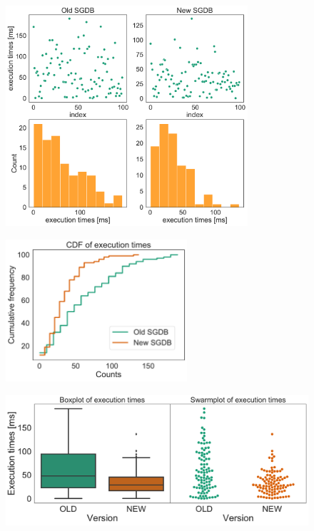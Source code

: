\documentclass[twoside,onecolumn]{article}
\theoremstyle{definition}
\begin{document}
\begin{figure} \centering
\includegraphics[width=0.8\textwidth]{../figs/extimes_distributions_vs_scatter.pdf}
\caption{}\label{fig:distribution_scatter}
\end{figure}


\begin{figure} \centering
\includegraphics[width=0.6\textwidth]{../figs/extimes_CDF.pdf}
\caption{}\label{fig:cdf}
\end{figure}


\begin{figure} \centering
\includegraphics[width=0.9
\textwidth]{../figs/extimes_quantiles.pdf}
\caption{}\label{fig:boxswarm}
\end{figure}
\end{document}
